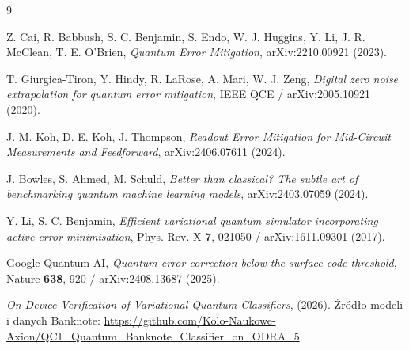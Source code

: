 \documentclass[11pt,a4paper]{article}
\begin{document}
\begin{thebibliography}{9}

Z. Cai, R. Babbush, S. C. Benjamin, S. Endo, W. J. Huggins, Y. Li, J. R. McClean,
T. E. O'Brien, \emph{Quantum Error Mitigation}, arXiv:2210.00921 (2023).

T. Giurgica-Tiron, Y. Hindy, R. LaRose, A. Mari, W. J. Zeng, \emph{Digital zero noise
extrapolation for quantum error mitigation}, IEEE QCE / arXiv:2005.10921 (2020).

J. M. Koh, D. E. Koh, J. Thompson, \emph{Readout Error Mitigation for Mid-Circuit
Measurements and Feedforward}, arXiv:2406.07611 (2024).

J. Bowles, S. Ahmed, M. Schuld, \emph{Better than classical? The subtle art of benchmarking
quantum machine learning models}, arXiv:2403.07059 (2024).

Y. Li, S. C. Benjamin, \emph{Efficient variational quantum simulator incorporating active
error minimisation}, Phys. Rev. X \textbf{7}, 021050 / arXiv:1611.09301 (2017).

Google Quantum AI, \emph{Quantum error correction below the surface code threshold},
Nature \textbf{638}, 920 / arXiv:2408.13687 (2025).

\emph{On-Device Verification of Variational Quantum Classifiers},  
(2026). Źródło modeli i danych Banknote:
\url{https://github.com/Kolo-Naukowe-Axion/QC1_Quantum_Banknote_Classifier_on_ODRA_5}.

\end{thebibliography}
\end{document}
